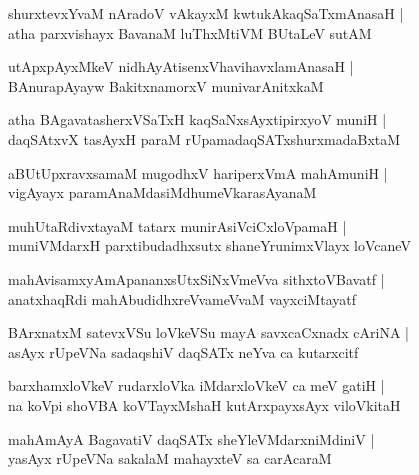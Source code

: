\documentclass[twoside,12pt,openright]{book}
\newcounter{shloka}[chapter]
\begin{document}
\begin{shloka}%
shurxtevxYvaM nAradoV vAkayxM kwtukAkaqSaTxmAnasaH |\\
atha parxvishayx BavanaM luThxMtiVM BUtaLeV sutAM 
\end{shloka}

\begin{shloka}%
utApxpAyxMkeV nidhAyAtisenxVhavihavxlamAnasaH |\\
BAnurapAyayw BakitxnamorxV munivarAnitxkaM 
\end{shloka}

\begin{shloka}%
atha BAgavatasherxVSaTxH kaqSaNxsAyxtipirxyoV muniH |\\
daqSAtxvX tasAyxH paraM rUpamadaqSATxshurxmadaBxtaM 
\end{shloka}

\begin{shloka}%
aBUtUpxravxsamaM mugodhxV hariperxVmA mahAmuniH |\\
vigAyayx paramAnaMdasiMdhumeVkarasAyanaM 
\end{shloka}

\begin{shloka}%
muhUtaRdivxtayaM tatarx munirAsiVciCxloVpamaH |\\
muniVMdarxH parxtibudadhxsutx shaneYrunimxVlayx loVcaneV 
\end{shloka}

\begin{shloka}%
mahAvisamxyAmApananxsUtxSiNxVmeVva sithxtoVBavatf |\\
anatxhaqRdi mahAbudidhxreVvameVvaM vayxciMtayatf 
\end{shloka}

\begin{shloka}%
BArxnatxM satevxVSu loVkeVSu mayA savxcaCxnadx cAriNA |\\
asAyx rUpeVNa sadaqshiV daqSATx neYva ca kutarxcitf 
\end{shloka}

\begin{shloka}%
barxhamxloVkeV rudarxloVka iMdarxloVkeV ca meV gatiH |\\
na koVpi shoVBA koVTayxMshaH kutArxpayxsAyx viloVkitaH 
\end{shloka}

\begin{shloka}%
mahAmAyA BagavatiV daqSATx sheYleVMdarxniMdiniV |\\
yasAyx rUpeVNa sakalaM mahayxteV sa carAcaraM 
\end{shloka}
\end{document}

